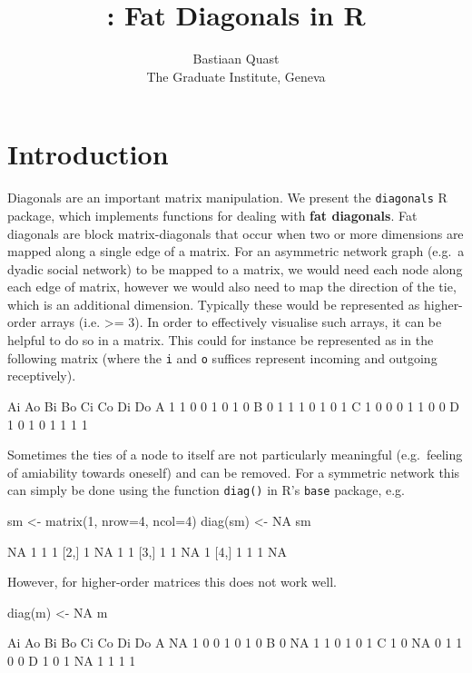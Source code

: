 \documentclass[article]{jss}
\author{
Bastiaan Quast\\The Graduate Institute, Geneva
}
\title{\pkg{diagonals}: Fat Diagonals in R}
\begin{document}
\section{Introduction}\label{introduction}

Diagonals are an important matrix manipulation. We present the
\texttt{diagonals} R package, which implements functions for dealing
with \textbf{fat diagonals}. Fat diagonals are block matrix-diagonals
that occur when two or more dimensions are mapped along a single edge of
a matrix. For an asymmetric network graph (e.g.~a dyadic social network)
to be mapped to a matrix, we would need each node along each edge of
matrix, however we would also need to map the direction of the tie,
which is an additional dimension. Typically these would be represented
as higher-order arrays (i.e. \textgreater{}= 3). In order to effectively
visualise such arrays, it can be helpful to do so in a matrix. This
could for instance be represented as in the following matrix (where the
\texttt{i} and \texttt{o} suffices represent incoming and outgoing
receptively).

\begin{CodeChunk}
\begin{CodeOutput}
  Ai Ao Bi Bo Ci Co Di Do
A  1  1  0  0  1  0  1  0
B  0  1  1  1  0  1  0  1
C  1  0  0  0  1  1  0  0
D  1  0  1  0  1  1  1  1
\end{CodeOutput}
\end{CodeChunk}

Sometimes the ties of a node to itself are not particularly meaningful
(e.g.~feeling of amiability towards oneself) and can be removed. For a
symmetric network this can simply be done using the function
\texttt{diag()} in R's \texttt{base} package, e.g.

\begin{CodeChunk}
\begin{CodeInput}
sm <- matrix(1, nrow=4, ncol=4)
diag(sm) <- NA
sm
\end{CodeInput}
\begin{CodeOutput}
     [,1] [,2] [,3] [,4]
[1,]   NA    1    1    1
[2,]    1   NA    1    1
[3,]    1    1   NA    1
[4,]    1    1    1   NA
\end{CodeOutput}
\end{CodeChunk}

However, for higher-order matrices this does not work well.

\begin{CodeChunk}
\begin{CodeInput}
diag(m) <- NA
m
\end{CodeInput}
\begin{CodeOutput}
  Ai Ao Bi Bo Ci Co Di Do
A NA  1  0  0  1  0  1  0
B  0 NA  1  1  0  1  0  1
C  1  0 NA  0  1  1  0  0
D  1  0  1 NA  1  1  1  1
\end{CodeOutput}
\end{CodeChunk}
\end{document}
